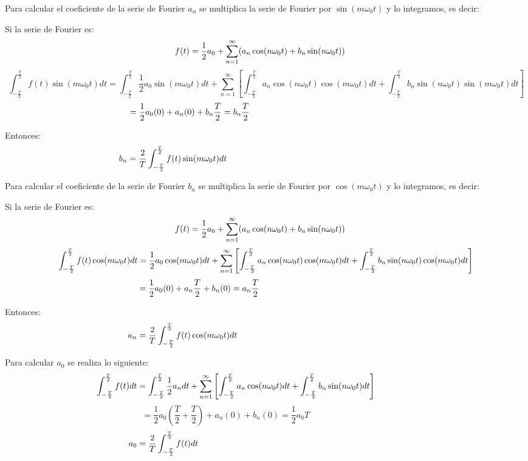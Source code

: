 \documentclass[a4paper]{article}
\begin{document}
{} Para calcular el coeficiente de la serie de Fourier $a_{n}$ se multiplica
la serie de Fourier por $\sin(m\omega_{0}t)$ y lo integramos, es decir: 

{} Si la serie de Fourier es:  
\[
f(t)=\frac{1}{2}a_{0}+\sum_{n=1}^{\infty}(a_{n}\cos(n\omega_{0}t)+b_{n}%
\sin(n\omega_{0}t)) \hspace{0.5cm}
\]
\[
\int_{-\frac{T}{2}}^{\frac{T}{2}}f(t)\sin(m\omega_{0}t)dt=\int_{-\frac{T}{2}%
}^{\frac{T}{2}}\frac{1}{2}a_{0}\sin(m\omega_{0}t)dt+ \sum_{n=1}^{\infty}%
\left[\int_{-\frac{T}{2}}^{\frac{T}{2}}a_{n}\cos(n\omega_{0}t)\cos(m%
\omega_{0}t)dt+\int_{-\frac{T}{2}}^{\frac{T}{2}}b_{n}\sin(n\omega_{0}t)%
\sin(m\omega_{0}t)dt\right]
\]
\[
=\frac{1}{2}a_{0}(0)+a_{n}(0)+b_{n}\frac{T}{2}=b_{n}\frac{T}{2} \hspace{6.3cm%
}
\]

{} Entonces:  
\[
b_{n}=\frac{2}{T}\int_{-\frac{T}{2}}^{\frac{T}{2}}f(t)\sin(m\omega_{0}t)dt 
\hspace{7.7cm}
\]

{} Para calcular el coeficiente de la serie de Fourier $b_{n}$ se multiplica
la serie de Fourier por $\cos(m\omega_{0}t)$ y lo integramos, es decir: 

{} Si la serie de Fourier es:  
\[
f(t)=\frac{1}{2}a_{0}+\sum_{n=1}^{\infty}(a_{n}\cos(n\omega_{0}t)+b_{n}%
\sin(n\omega_{0}t)) \hspace{0.5cm}
\]
\[
\int_{-\frac{T}{2}}^{\frac{T}{2}}f(t)\cos(m\omega_{0}t)dt= \frac{1}{2}%
a_{0}\cos(m\omega_{0}t)dt+ \sum_{n=1}^{\infty}\left[\int_{-\frac{T}{2}}^{%
\frac{T}{2}}a_{n}\cos(n\omega_{0}t)\cos(m\omega_{0}t)dt+\int_{-\frac{T}{2}}^{%
\frac{T}{2}}b_{n}\sin(n\omega_{0}t)\cos(m\omega_{0}t)dt\right]
\]
\[
=\frac{1}{2}a_{0}(0)+a_{n}\frac{T}{2}+b_{n}(0)=a_{n}\frac{T}{2} \hspace{5.5cm%
}
\]

{} Entonces:  
\[
a_{n}=\frac{2}{T}\int_{-\frac{T}{2}}^{\frac{T}{2}}f(t)\cos(m\omega_{0}t)dt 
\hspace{6.9cm}
\]

{} Para calcular $a_{0}$ se realiza lo siguiente:  
\[
\int_{-\frac{T}{2}}^{\frac{T}{2}}f(t)dt= \int_{-\frac{T}{2}}^{\frac{T}{2}}%
\frac{1}{2}a_{n}dt+\sum_{n=1}^{\infty}\left[ \int_{-\frac{T}{2}}^{\frac{T}{2}%
}a_{n}\cos(n\omega_{0}t)dt+\int_{-\frac{T}{2}}^{\frac{T}{2}%
}b_{n}\sin(n\omega_{0}t)dt \right]\hspace{2.5cm}
\]
\[
=\frac{1}{2}a_{0}\left(\frac{T}{2}+\frac{T}{2}\right)+a_{n}(0)+b_{n}(0)=%
\frac{1}{2}a_{0}T \hspace{4cm}
\]
\[
a_{0}=\frac{2}{T}\int_{-\frac{T}{2}}^{\frac{T}{2}}f(t)dt \hspace{8.5cm}
\]
\end{document}
